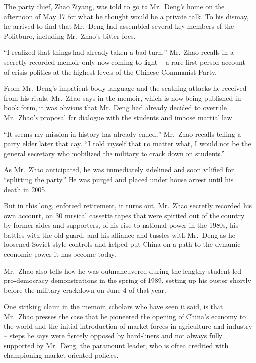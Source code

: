 \documentclass[12pt,a4paper,onecolumn]{article}
\begin{document}
The party chief, Zhao Ziyang, was told to go to Mr.~Deng's home on the afternoon of May 17 for what
he thought would be a private talk. To his dismay, he arrived to find that Mr.~Deng had assembled
several key members of the Politburo, including Mr.~Zhao's bitter foes.

``I realized that things had already taken a bad turn,'' Mr.~Zhao recalls in a secretly recorded
memoir only now coming to light -- a rare first-person account of crisis politics at the highest
levels of the Chinese Communist Party.

From Mr.~Deng's impatient body language and the scathing attacks he received from his rivals,
Mr.~Zhao says in the memoir, which is now being published in book form, it was obvious that Mr.~Deng
had already decided to overrule Mr.~Zhao's proposal for dialogue with the students and impose
martial law.

``It seems my mission in history has already ended,'' Mr.~Zhao recalls telling a party elder later
that day. ``I told myself that no matter what, I would not be the general secretary who mobilized
the military to crack down on students.''

As Mr.~Zhao anticipated, he was immediately sidelined and soon vilified for ``splitting the party.''
He was purged and placed under house arrest until his death in 2005.

But in this long, enforced retirement, it turns out, Mr.~Zhao secretly recorded his own account, on
30 musical cassette tapes that were spirited out of the country by former aides and supporters, of
his rise to national power in the 1980s, his battles with the old guard, and his alliance and
tussles with Mr.~Deng as he loosened Soviet-style controls and helped put China on a path to the
dynamic economic power it has become today.

Mr.~Zhao also tells how he was outmaneuvered during the lengthy student-led pro-democracy
demonstrations in the spring of 1989, setting up his ouster shortly before the military crackdown on
June 4 of that year.

One striking claim in the memoir, scholars who have seen it said, is that Mr.~Zhao presses the case
that he pioneered the opening of China's economy to the world and the initial introduction of market
forces in agriculture and industry -- steps he says were fiercely opposed by hard-liners and not
always fully supported by Mr.~Deng, the paramount leader, who is often credited with championing
market-oriented policies.
\end{document}
